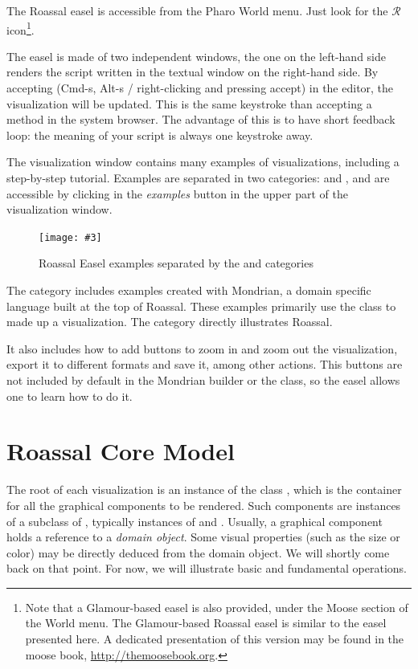 \documentclass[a4paper,10pt,twoside]{book}
\newcommand{\fig}[4]{
		\begin{figure}[#1]
			\centering
			\texttt{[image: \#3]}
			\caption{\label{fig:#3}#4}
		\end{figure}}
\begin{document}
The Roassal easel is accessible from the Pharo World menu. Just look for the {\color{red} $\mathcal{R}$} icon\footnote{Note that a Glamour-based easel is also provided, under the Moose section of the World menu. The Glamour-based Roassal easel is similar to the easel presented here. A dedicated presentation of this version may be found in the moose book, \url{http://themoosebook.org}.}.

The easel is made of two independent windows, the one on the left-hand side renders the script written in the textual window on the right-hand side. By accepting (Cmd-s, Alt-s / right-clicking and pressing accept) in the editor, the visualization will be updated. This is the same keystroke than accepting a method in the system browser. The advantage of this is to have short feedback loop: the meaning of your script is always one keystroke away.

The visualization window contains many examples of visualizations, including a step-by-step tutorial. Examples are separated in two categories:  and , and are accessible by clicking in the \textit{examples} button in the upper part of the visualization window.

\fig{H}{1}{ROEasel}{Roassal Easel examples separated by the \ct{ROMondrianViewBuilder} and \ct{ROExample} categories}


The  category includes examples created with Mondrian, a domain specific language built at the top of Roassal. These examples primarily use the  class to made up a visualization. The   category directly illustrates Roassal.

It also includes how to add buttons to zoom in and zoom out the visualization, export it to different formats and save it, among other actions. This buttons are not included by default in the Mondrian builder or the  class, so the easel allows one to learn how to do it.


\section{Roassal Core Model}

The root of each visualization is an instance of the class , which is the container for all the graphical components to be rendered.
Such components are instances of a subclass of , typically instances of  and . Usually, a graphical component holds a reference to a \emph{domain object}. Some visual properties (such as the size or color) may be directly deduced from the domain object. We will shortly come back on that point. For now, we will illustrate basic and fundamental operations.
\end{document}
